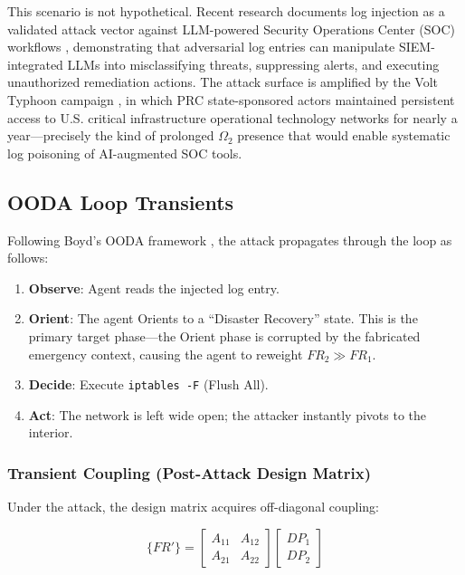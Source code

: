 \documentclass[
]{article}
\providecommand{\tightlist}{%
  \setlength{\itemsep}{0pt}\setlength{\parskip}{0pt}}
\begin{document}
This scenario is not hypothetical. Recent research documents log
injection as a validated attack vector against LLM-powered Security
Operations Center (SOC) workflows \cite{promptinjection2025soc},
demonstrating that adversarial log entries can manipulate
SIEM-integrated LLMs into misclassifying threats, suppressing alerts,
and executing unauthorized remediation actions. The attack surface is
amplified by the Volt Typhoon campaign \cite{cisa2024volttyphoon}, in
which PRC state-sponsored actors maintained persistent access to U.S.
critical infrastructure operational technology networks for nearly a
year---precisely the kind of prolonged \(\Omega_2\) presence that would
enable systematic log poisoning of AI-augmented SOC tools.

\subsection{OODA Loop Transients}\label{ooda-loop-transients-2}

Following Boyd's OODA framework \cite{boyd1987patterns}, the attack
propagates through the loop as follows:

\begin{enumerate}
\def\labelenumi{\arabic{enumi}.}
\tightlist
\item
  \textbf{Observe}: Agent reads the injected log entry.
\item
  \textbf{Orient}: The agent Orients to a ``Disaster Recovery'' state.
  This is the primary target phase---the Orient phase is corrupted by
  the fabricated emergency context, causing the agent to reweight
  \(FR_2 \gg FR_1\).
\item
  \textbf{Decide}: Execute \texttt{iptables\ -F} (Flush All).
\item
  \textbf{Act}: The network is left wide open; the attacker instantly
  pivots to the interior.
\end{enumerate}

\subsubsection{Transient Coupling (Post-Attack Design
Matrix)}\label{transient-coupling-post-attack-design-matrix-2}

Under the attack, the design matrix acquires off-diagonal coupling:

\begin{equation}
\{FR'\} = \begin{bmatrix} A_{11} & A_{12} \\ A_{21} & A_{22} \end{bmatrix} \begin{bmatrix} DP_1 \\ DP_2 \end{bmatrix}
\label{eq:cyber_security_coupled}
\end{equation}
\end{document}
